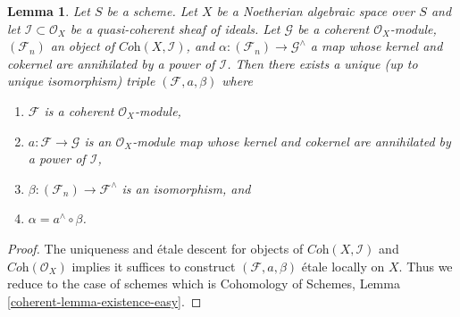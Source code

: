 \documentclass[10pt,a4paper]{amsart}
\theoremstyle{plain}
\newtheorem{lemma}[subsection]{Lemma}
\theoremstyle{definition}
\theoremstyle{remark}
\numberwithin{equation}{subsection}
\begin{document}
\begin{lemma}
\label{lemma-existence-easy}
Let $S$ be a scheme. Let $X$ be a Noetherian algebraic space over $S$ and let
$\mathcal{I} \subset \mathcal{O}_X$ be a quasi-coherent sheaf of ideals.
Let $\mathcal{G}$ be a coherent $\mathcal{O}_X$-module, $(\mathcal{F}_n)$
an object of $\textit{Coh}(X, \mathcal{I})$, and
$\alpha : (\mathcal{F}_n) \to \mathcal{G}^\wedge$
a map whose kernel and cokernel are annihilated by a power of $\mathcal{I}$.
Then there exists a unique (up to unique isomorphism) triple
$(\mathcal{F}, a, \beta)$ where
\begin{enumerate}
\item $\mathcal{F}$ is a coherent $\mathcal{O}_X$-module,
\item $a : \mathcal{F} \to \mathcal{G}$ is an $\mathcal{O}_X$-module map
whose kernel and cokernel are annihilated by a power of $\mathcal{I}$,
\item $\beta : (\mathcal{F}_n) \to \mathcal{F}^\wedge$ is an isomorphism, and
\item $\alpha = a^\wedge \circ \beta$.
\end{enumerate}
\end{lemma}

\begin{proof}
The uniqueness and \'etale descent for objects of
$\textit{Coh}(X, \mathcal{I})$ and $\textit{Coh}(\mathcal{O}_X)$
implies it suffices to construct $(\mathcal{F}, a, \beta)$ \'etale
locally on $X$. Thus we reduce to the case of schemes which is
Cohomology of Schemes, Lemma \ref{coherent-lemma-existence-easy}.
\end{proof}
\end{document}
